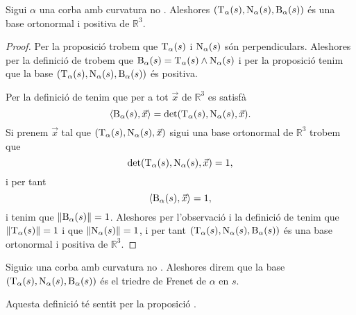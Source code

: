 \documentclass[../../Main.tex]{subfiles}
\begin{document}
	\begin{proposition}
		\label{prop:triedre de Frenet}
		Sigui \(\alpha\) una corba amb curvatura no \nulla{}. Aleshores \((\operatorname{T}_{\alpha}(s),\operatorname{N}_{\alpha}(s),\operatorname{B}_{\alpha}(s))\) és una base ortonormal i positiva de \(\mathbb{R}^{3}\).
		\begin{proof}
			Per la proposició  trobem que \(\operatorname{T}_{\alpha}(s)\) i \(\operatorname{N}_{\alpha}(s)\) són perpendiculars. Aleshores per la definició de  trobem que \(\operatorname{B}_{\alpha}(s)=\operatorname{T}_{\alpha}(s)\mathbin{\wedge}\operatorname{N}_{\alpha}(s)\) i per la proposició  tenim que la base \((\operatorname{T}_{\alpha}(s),\operatorname{N}_{\alpha}(s),\operatorname{B}_{\alpha}(s))\) és positiva.
			
			Per la definició de  tenim que per a tot \(\vec{x}\) de \(\mathbb{R}^{3}\) es satisfà
			\[\prodesc{\binormal_{\alpha}(s)}{\vec{x}}=\det(\tangent_{\alpha}(s),\normal_{\alpha}(s),\vec{x}).\]
			Si prenem \(\vec{x}\) tal que \((\operatorname{T}_{\alpha}(s),\operatorname{N}_{\alpha}(s),\vec{x})\) sigui una base ortonormal de \(\mathbb{R}^{3}\) trobem que
			\[\det(\operatorname{T}_{\alpha}(s),\operatorname{N}_{\alpha}(s),\vec{x})=1,\]
			i per tant
			\[\prodesc{\binormal_{\alpha}(s)}{\vec{x}}=1,\]
			i tenim que \(\norm{\binormal_{\alpha}(s)}=1\). Aleshores per l'observació  i la definició de  tenim que \(\norm{\tangent_{\alpha}(s)}=1\) i que \(\norm{\normal_{\alpha}(s)}=1\), i per tant \((\operatorname{T}_{\alpha}(s),\operatorname{N}_{\alpha}(s),\operatorname{B}_{\alpha}(s))\) és una base ortonormal i positiva de \(\mathbb{R}^{3}\). %
		\end{proof}
	\end{proposition}
	\begin{definition}
		\label{def:triedre de Frenet}
		Sigui\(\alpha\) una corba amb curvatura no \nulla{}. Aleshores direm que la base \((\operatorname{T}_{\alpha}(s),\operatorname{N}_{\alpha}(s),\operatorname{B}_{\alpha}(s))\) és el triedre de Frenet de \(\alpha\) en \(s\).
		
		Aquesta definició té sentit per la proposició .
	\end{definition}
\end{document}
